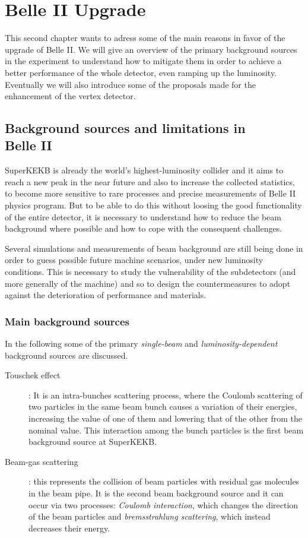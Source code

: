 \chapter{Belle II Upgrade} \label{ch:upgrade}

This second chapter wants to adress some of the main reasons in favor of the upgrade of Belle II. We will give an overview of the primary background sources in the experiment to understand how to mitigate them in order to achieve a better performance of the whole detector, even ramping up the luminosity. Eventually we will also introduce some of the proposals made for the enhancement of the vertex detector.


\section{Background sources and limitations in \\Belle II}

SuperKEKB is already the world's highest-luminosity collider and it aims to reach a new peak in the near future and also to increase the collected statistics, to become more sensitive to rare processes and precise measurements of Belle II physics program. 
But to be able to do this without loosing the good functionality of the entire detector, it is necessary to understand how to reduce the beam background where possible and how to cope with the consequent challenges.

Several simulations and measurements of beam background are still being done in order to guess possible future machine scenarios, under new luminosity conditions.
This is necessary to study the vulnerability of the subdetectors (and more generally of the machine) and so to design the countermeasures to adopt against the deterioration of performance and materials.


\subsection{Main background sources}

In the following some of the primary \textit{single-beam} and \textit{luminosity-dependent} background sources are discussed.


\begin{description}
\item[Touschek effect]: 
	It is an intra-bunches scattering process, where the Coulomb scattering of two particles in the same beam bunch causes a variation of their energies, increasing the value of one of them and lowering that of the other from the nominal value. This interaction among the bunch particles is the first beam background source at SuperKEKB.
\item[Beam-gas scattering]: 
	this represents the collision of beam particles with residual gas molecules in the beam pipe. It is the second beam background source and it can occur via two processes: \emph{Coulomb interaction}, which changes the direction of the beam particles and \emph{bremsstrahlung scattering}, which instead decreases their energy. 
\end{description}
	
